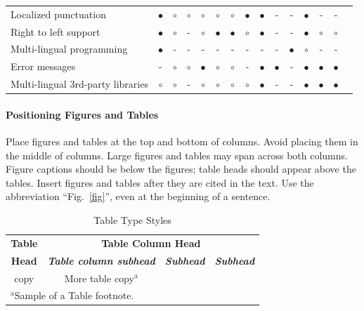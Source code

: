 \documentclass[conference]{IEEEtran}
\begin{document}
\begin{table}[t]
\begin{tabularx}{\textwidth}{l *{14}{c}}
Localized punctuation & $\bullet$ & $\circ$ & $\circ$ & $\circ$ & $\circ$ & $\circ$ & $\bullet$ & $\bullet$ & - & - & $\bullet$ & - & - \\
Right to left support & $\bullet$ & $\circ$ & - & $\circ$ & $\bullet$ & $\bullet$ & $\circ$ & $\bullet$ & - & - & $\bullet$ & $\circ$ & $\circ$ \\
Multi-lingual programming & $\bullet$ & - & - & - & - & - & - & - & - & $\bullet$ & $\circ$ & - & - \\
Error messages & - & $\circ$ & $\circ$ & $\bullet$ & $\circ$ & $\circ$ & - & $\bullet$ & $\bullet$ & - & $\bullet$ & $\bullet$ & $\bullet$ \\
Multi-lingual 3rd-party libraries & $\circ$ & $\circ$ & - & $\circ$ & $\circ$ & $\circ$ & $\circ$ & $\bullet$ & - & - & $\bullet$ & $\bullet$ & $\bullet$ \\
\hline
\end{tabularx}
\end{table}


\paragraph{Positioning Figures and Tables} Place figures and tables at the top and 
bottom of columns. Avoid placing them in the middle of columns. Large 
figures and tables may span across both columns. Figure captions should be 
below the figures; table heads should appear above the tables. Insert 
figures and tables after they are cited in the text. Use the abbreviation 
``Fig.~\ref{fig}'', even at the beginning of a sentence.

\begin{table}[htbp]
\caption{Table Type Styles}
\begin{center}
\begin{tabular}{|c|c|c|c|}
\hline
\textbf{Table}&\multicolumn{3}{|c|}{\textbf{Table Column Head}} \\
\cline{2-4} 
\textbf{Head} & \textbf{\textit{Table column subhead}}& \textbf{\textit{Subhead}}& \textbf{\textit{Subhead}} \\
\hline
copy& More table copy$^{\mathrm{a}}$& &  \\
\hline
\multicolumn{4}{l}{$^{\mathrm{a}}$Sample of a Table footnote.}
\end{tabular}
\label{tab1}
\end{center}
\end{table}
\end{document}
